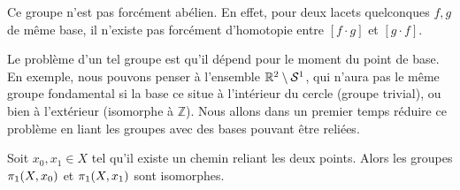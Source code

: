 \documentclass[hidelinks, 10pt]{article}
\begin{document}
\begin{remark}
Ce groupe n'est pas forcément abélien. En effet, pour deux lacets quelconques $f,g$ de même base, il n'existe pas forcément d'homotopie entre $[f\cdot g]$ et $[g\cdot f]$.
\end{remark}

Le problème d'un tel groupe est qu'il dépend pour le moment du point de base. En exemple, nous pouvons penser à l'ensemble $\mathbb{R}^2\setminus\mathcal{S}^{1}$, qui n'aura pas le même groupe fondamental si la base ce situe à l'intérieur du cercle (groupe trivial), ou bien à l'extérieur (isomorphe à $\mathbb{Z}$). Nous allons dans un premier temps réduire ce problème en liant les groupes avec des bases pouvant être reliées.
\begin{theorem}
Soit $x_0,x_1\in X$ tel qu'il existe un chemin reliant les deux points. Alors les groupes $\pi_1(X,x_0)$ et $\pi_1(X,x_1)$ sont isomorphes.
\end{theorem}
\end{document}
